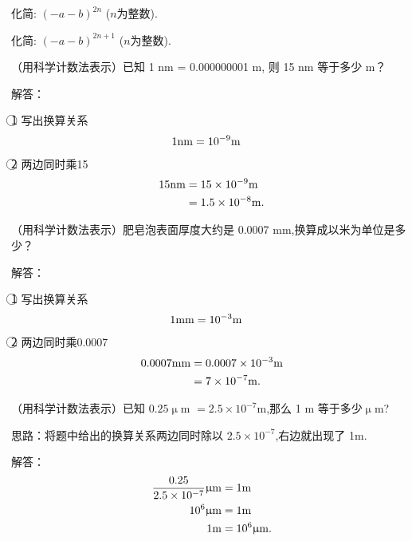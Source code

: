 \item{
    化简: $(-a-b)^{2n}$ ($n$为整数).
}
\item{
    化简: $(-a-b)^{2n+1}$ ($n$为整数).
}
\item{
    （用科学计数法表示）已知 1 nm = 0.000000001 m, 则 15 nm 等于多少 m？

    \fangsong{}
    解答：

    \textcircled{1} 写出换算关系
    \begin{align*}
        1 \rm{nm} &= 10^{-9} \rm{m}
    \end{align*}
    \textcircled{2} 两边同时乘15
    \begin{align*}
        15 \rm{nm} &= 15 \times 10^{-9} \rm{m}\\
        &= 1.5\times 10^{-8} \rm{m}.
    \end{align*}
}
\item{
    （用科学计数法表示）肥皂泡表面厚度大约是 0.0007 mm,换算成以米为单位是多少？

    \fangsong{}
    解答：

    \textcircled{1} 写出换算关系
    \begin{align*}
        1 \rm{mm} &= 10^{-3} \rm{m}
    \end{align*}
    \textcircled{2} 两边同时乘0.0007
    \begin{align*}
        0.0007 \rm{mm} &= 0.0007 \times 10^{-3} \rm{m}\\
        &= 7\times 10^{-7} \rm{m}.
    \end{align*}
}
\item{
    （用科学计数法表示）已知 $0.25 \upmu$m $ = 2.5\times 10^{-7}$m,那么 1 m 等于多少$\upmu$m?

    \fangsong{}
    思路：将题中给出的换算关系两边同时除以 $2.5\times 10^{-7}$,右边就出现了 1m.

    解答：
    \begin{align*}
        \frac{0.25}{2.5\times 10^{-7}} \rm{\upmu m} &= 1\rm{m}\\
        10^6 \rm{\upmu m} &= 1\rm{m}\\
        1\rm{m} &= 10^6 \rm{\upmu m}.
    \end{align*}
}
